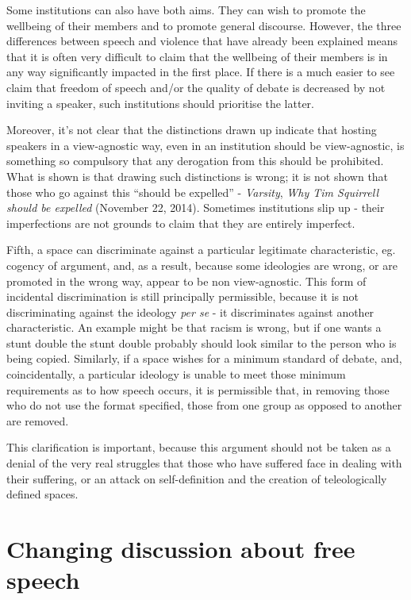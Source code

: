 \documentclass[10pt,a4paper,twoside]{article}
\begin{document}
\begin{multicols}{2}
Some institutions can also have both aims. They can wish to promote the
wellbeing of their members and to promote general discourse. However,
the three differences between speech and violence that have already been
explained means that it is often very difficult to claim that the
wellbeing of their members is in any way significantly impacted in the
first place. If there is a much easier to see claim that freedom of
speech and/or the quality of debate is decreased by not inviting a
speaker, such institutions should prioritise the latter.

Moreover, it's not clear that the distinctions drawn up indicate that
hosting speakers in a view-agnostic way, even in an institution should
be view-agnostic, is something so compulsory that any derogation from
this should be prohibited. What is shown is that drawing such
distinctions is wrong; it is not shown that those who go against this
``should be expelled'' - \emph{Varsity}, \emph{Why Tim Squirrell should
	be expelled} (November 22, 2014). Sometimes institutions slip up - their
imperfections are not grounds to claim that they are entirely imperfect.

Fifth, a space can discriminate against a particular legitimate
characteristic, eg. cogency of argument, and, as a result, because some
ideologies are wrong, or are promoted in the wrong way, appear to be non
view-agnostic. This form of incidental discrimination is still
principally permissible, because it is not discriminating against the
ideology \emph{per se} - it discriminates against another
characteristic. An example might be that racism is wrong, but if one
wants a stunt double the stunt double probably should look similar to
the person who is being copied. Similarly, if a space wishes for a
minimum standard of debate, and, coincidentally, a particular ideology
is unable to meet those minimum requirements as to how speech occurs, it
is permissible that, in removing those who do not use the format
specified, those from one group as opposed to another are removed.

This clarification is important, because this argument should not be
taken as a denial of the very real struggles that those who have
suffered face in dealing with their suffering, or an attack on
self-definition and the creation of teleologically defined spaces.

\section{Changing discussion about free
	speech}\label{changing-discussion-about-free-speech}


\end{multicols}
\end{document}
